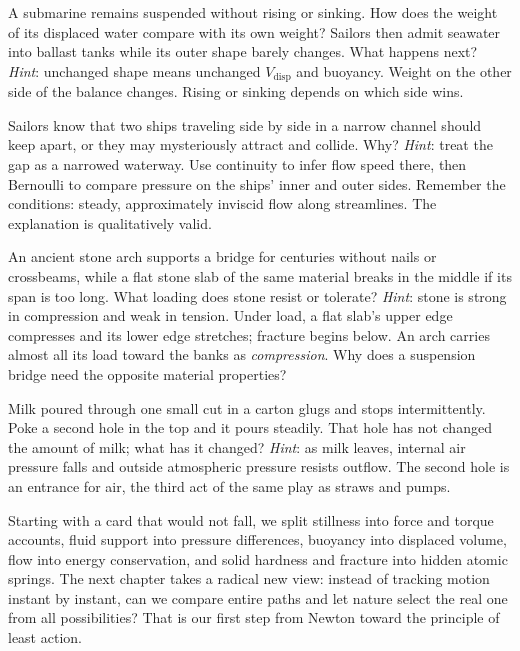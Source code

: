 \begin{puzzles}
\item A submarine remains suspended without rising or sinking. How does the weight of its displaced water compare with its own weight? Sailors then admit seawater into ballast tanks while its outer shape barely changes. What happens next? \emph{Hint}: unchanged shape means unchanged \(V_{\text{disp}}\) and buoyancy. Weight on the other side of the balance changes. Rising or sinking depends on which side wins.
\item Sailors know that two ships traveling side by side in a narrow channel should keep apart, or they may mysteriously attract and collide. Why? \emph{Hint}: treat the gap as a narrowed waterway. Use continuity to infer flow speed there, then Bernoulli to compare pressure on the ships' inner and outer sides. Remember the conditions: steady, approximately inviscid flow along streamlines. The explanation is qualitatively valid.
\item An ancient stone arch supports a bridge for centuries without nails or crossbeams, while a flat stone slab of the same material breaks in the middle if its span is too long. What loading does stone resist or tolerate? \emph{Hint}: stone is strong in compression and weak in tension. Under load, a flat slab's upper edge compresses and its lower edge stretches; fracture begins below. An arch carries almost all its load toward the banks as \emph{compression}. Why does a suspension bridge need the opposite material properties?
\item Milk poured through one small cut in a carton glugs and stops intermittently. Poke a second hole in the top and it pours steadily. That hole has not changed the amount of milk; what has it changed? \emph{Hint}: as milk leaves, internal air pressure falls and outside atmospheric pressure resists outflow. The second hole is an entrance for air, the third act of the same play as straws and pumps.
\end{puzzles}

Starting with a card that would not fall, we split stillness into force and torque accounts, fluid support into pressure differences, buoyancy into displaced volume, flow into energy conservation, and solid hardness and fracture into hidden atomic springs. The next chapter takes a radical new view: instead of tracking motion instant by instant, can we compare entire paths and let nature select the real one from all possibilities? That is our first step from Newton toward the principle of least action.

